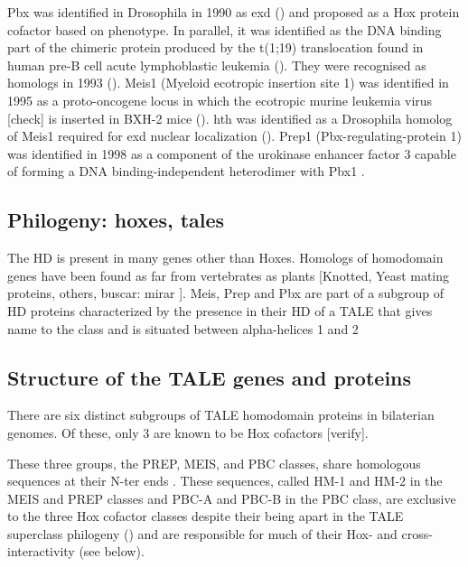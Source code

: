 Pbx was identified in Drosophila in 1990 as \ac{exd} (\cite{Peifer1990}) and proposed as a Hox protein cofactor based on phenotype. In parallel, it was identified as the DNA binding part of the chimeric protein produced by the t(1;19) translocation found in human pre-B cell acute lymphoblastic leukemia (\cite{Kamps1990}). They were recognised as homologs in 1993 (\cite{Rauskolb1993}).
Meis1 (Myeloid ecotropic insertion site 1) was identified in 1995 as a proto-oncogene locus in which the ecotropic murine leukemia virus [check] is inserted in BXH-2 mice (\cite{Moskow1995}). \ac{hth} was identified as a Drosophila homolog of Meis1 required for \ac{exd} nuclear localization (\cite{Rauskolb1995, Rieckhof1997}).
Prep1 (Pbx-regulating-protein 1) was identified in 1998 as a component of the urokinase enhancer factor 3 capable of forming a DNA binding-independent heterodimer with Pbx1 \cite{Berthelsen1998,Berthelsen1998a}.

\subsection{Philogeny: hoxes, tales}

The \ac{HD} is present in many genes other than Hoxes. Homologs of homodomain genes have been found as far from vertebrates as plants [Knotted, Yeast mating proteins, others, buscar: mirar \cite{Burglin1997}]. Meis, Prep and Pbx are part of a subgroup of \ac{HD} proteins characterized by the presence in their \ac{HD} of a \ac{TALE} that gives name to the class and is situated between alpha-helices 1 and 2 \cite{Bertolino1995, Burglin1997, Mukherjee2007, Moens2006}

\subsection{Structure of the TALE genes and proteins}

There are six distinct subgroups of \ac{TALE} homodomain proteins in bilaterian genomes. Of these, only 3 are known to be Hox cofactors [verify]. 

These three groups, the PREP, MEIS, and PBC classes, share homologous sequences at their \ac{N-ter} ends \cite{Burglin1998}. These sequences, called HM-1 and HM-2 in the MEIS and PREP classes and PBC-A and PBC-B in the PBC class, are exclusive to the three Hox cofactor classes despite their being apart in the \ac{TALE} superclass philogeny (\cite{Mukherjee2007}) and are responsible for much of their Hox- and cross-interactivity (see below).

